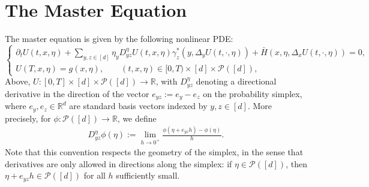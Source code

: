 \documentclass[11pt,reqno]{amsart}
\numberwithin{equation}{section}
\theoremstyle{plain}
\newcommand{\R}{\mathbb{R}}
\newcommand{\calP}{{\mathcal P}}
\newcommand{\1}{\boldsymbol{\mathbbm{1}}}
\begin{document}
\section{The Master Equation}
The master equation is given by the following nonlinear PDE:
\begin{equation}\label{master_equation:finite_horizon}
    \begin{cases}
    \partial_t U(t,x,\eta) + \sum_{y,z\in [d]} \eta_y D^\eta_{yz} U(t,x,\eta) \gamma_z^*(y, \Delta_y U(t,\cdot,\eta)) + \bar H(x,\eta,\Delta_x U(t,\cdot,\eta)) = 0, \\
    U(T,x,\eta) = g(x,\eta), \qquad (t,x,\eta) \in [0,T)\times [d]\times \calP([d]),
    \end{cases}
\end{equation}
Above, $U : [0, T] \times [d] \times \calP([d]) \to \R$, with $D_{yz}^\eta$ denoting a directional derivative in the direction of the vector $e_{yz} := e_y - e_z$ on the probability simplex, where $e_y, e_z \in \R^d$ are standard basis vectors indexed by $y, z \in [d]$. More precisely, for $\phi : \calP([d]) \to \R$, we define
\begin{align}
\label{eqn:dir-derivative}
    D_{yz}^\eta \phi(\eta) := \lim_{h \to 0^+} \frac{\phi(\eta + e_{yz} h) - \phi(\eta)}{h}.
\end{align}
Note that this convention respects the geometry of the simplex, in the sense that derivatives are only allowed in directions along the simplex: if $\eta \in \calP([d])$, then $\eta + e_{yz} h \in \calP([d])$ for all $h$ sufficiently small.
\end{document}
